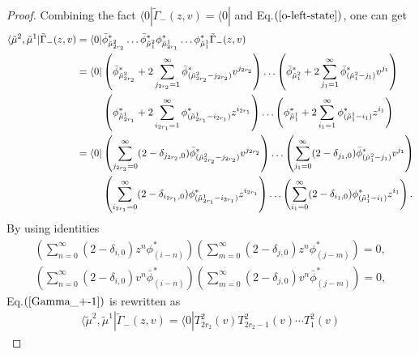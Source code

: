 \documentclass[11pt,reqno]{amsart}
\numberwithin{equation}{section}
\begin{document}
	\begin{proof}
		Combining the  fact
		$\langle 0| \tilde{\Gamma}_-(z,v)=\langle 0| $
		and Eq.$(\ref{o-left-state})$, one can get
		\begin{align}\label{Gamma_+-1}
			\langle \tilde{\mu}^2,\tilde{\mu}^1|\tilde{\Gamma}_-(z,v)
			= \langle 0|
			&\bar{\phi}_{\tilde{\mu}^{2}_{2r_{2}}}^* \dots \bar{\phi}_{\tilde{\mu}^{2}_1}^*
			\phi_{\tilde{\mu}^{1}_{2r_{1}}}^* \dots \phi_{\tilde{\mu}^{1}_1}^*
			\tilde{\Gamma}_-(z,v)\notag\\
			=\langle 0|
			&\left( \bar{\phi}_{\tilde{\mu}^{2}_{2r_{2}}}^* + 2\sum_{j_{2r_{2}}=1}^{\infty}
			\bar{\phi}_{(\tilde{\mu}^{2}_{2r_{2}}-j_{2r_{2}})}^*  v^{j_{2r_{2}}} \right)
			\ldots
			\left( \bar{\phi}_{\tilde{\mu}^{2}_1}^* + 2\sum_{j_1=1}^{\infty}
			\bar{\phi}_{(\tilde{\mu}^{2}_1-j_1)}^*  v^{j_1} \right)\notag\\
			&\left( \phi_{\tilde{\mu}^{1}_{2r_{1}}}^* + 2\sum_{i_{2r_{1}}=1}^{\infty}
			\phi_{(\tilde{\mu}^{1}_{2r_{1}}-i_{2r_{1}})}^*  z^{i_{2r_{1}}} \right)
			\ldots
			\left( \phi_{\tilde{\mu}^{1}_1}^* + 2\sum_{i_1=1}^{\infty}
			\phi_{(\tilde{\mu}^{1}_1-i_1)}^*  z^{i_1} \right)	\notag\\
			=\langle 0|
			&\left( \sum_{j_{2r_{2}}=0}^{\infty}  (2 - \delta_{j_{2r_{2}},0})
			\bar{\phi}_{(\tilde{\mu}^{2}_{2r_{2}}-j_{2r_{2}})}^*  v^{j_{2r_{2}}} \right)
			\ldots
			\left( \sum_{j_1=0}^{\infty}  (2 - \delta_{j_{1},0})
			\bar{\phi}_{(\tilde{\mu}^{2}_1-j_1)}^*  v^{j_1} \right)\notag\\
			&\left( \sum_{i_{2r_{1}}=0}^{\infty}  (2 - \delta_{i_{2r_{1}},0})
			\phi_{(\tilde{\mu}^{1}_{2r_{1}}-i_{2r_{1}})}^*  z^{i_{2r_{1}}} \right)
			\ldots
			\left( \sum_{i_1=0}^{\infty}  (2 - \delta_{i_{1},0})
			\phi_{(\tilde{\mu}^{1}_1-i_1)}^*  z^{i_1} \right)	.
		\end{align}
		By using  identities
		\begin{align}
			\left( \sum_{n=0}^{\infty} (2 - \delta_{i,0}) z^n \phi_{(i-n)}^* \right)
			\left( \sum_{m=0}^{\infty} (2 - \delta_{j,0}) z^n \phi_{(j-m)}^* \right) = 0,\\
			\left( \sum_{n=0}^{\infty} (2 - \delta_{i,0}) v^n \bar{\phi}_{(i-n)}^* \right)
			\left( \sum_{m=0}^{\infty} (2 - \delta_{j,0}) v^n \bar{\phi}_{(j-m)}^* \right) = 0,
		\end{align}
		Eq.$(\ref{Gamma_+-1})$ is rewritten as
		\begin{align}
			\langle \tilde{\mu}^2,\tilde{\mu}^1|\tilde{\Gamma}_-(z,v)
			=\langle 0|T_{2r_{2}}^{2}(v)T_{2r_{2}-1}^{2}(v) \cdots T_{1}^{2}(v)

\end{align}
\end{proof}
\end{document}
